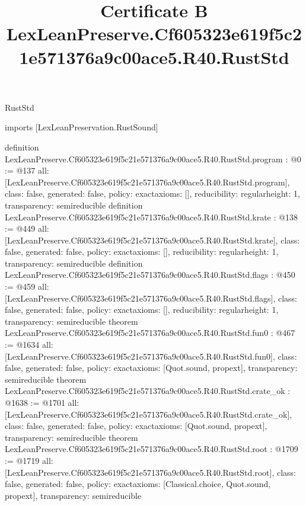 \begin{lexlean}{RustStd}
\title{Certificate B LexLeanPreserve.Cf605323e619f5c21e571376a9c00ace5.R40.RustStd}
\begin{coremodule}
imports [LexLeanPreservation.RustSound]

definition LexLeanPreserve.Cf605323e619f5c21e571376a9c00ace5.R40.RustStd.program : @0 := @137 {
  all: [LexLeanPreserve.Cf605323e619f5c21e571376a9c00ace5.R40.RustStd.program],
  class: false,
  generated: false,
  policy: exact{axioms: []},
  reducibility: regular{height: 1},
  transparency: semireducible
}
definition LexLeanPreserve.Cf605323e619f5c21e571376a9c00ace5.R40.RustStd.krate : @138 := @449 {
  all: [LexLeanPreserve.Cf605323e619f5c21e571376a9c00ace5.R40.RustStd.krate],
  class: false,
  generated: false,
  policy: exact{axioms: []},
  reducibility: regular{height: 1},
  transparency: semireducible
}
definition LexLeanPreserve.Cf605323e619f5c21e571376a9c00ace5.R40.RustStd.flags : @450 := @459 {
  all: [LexLeanPreserve.Cf605323e619f5c21e571376a9c00ace5.R40.RustStd.flags],
  class: false,
  generated: false,
  policy: exact{axioms: []},
  reducibility: regular{height: 1},
  transparency: semireducible
}
theorem LexLeanPreserve.Cf605323e619f5c21e571376a9c00ace5.R40.RustStd.fun0 : @467 := @1634 {
  all: [LexLeanPreserve.Cf605323e619f5c21e571376a9c00ace5.R40.RustStd.fun0],
  class: false,
  generated: false,
  policy: exact{axioms: [Quot.sound, propext]},
  transparency: semireducible
}
theorem LexLeanPreserve.Cf605323e619f5c21e571376a9c00ace5.R40.RustStd.crate_ok : @1638 := @1701 {
  all: [LexLeanPreserve.Cf605323e619f5c21e571376a9c00ace5.R40.RustStd.crate_ok],
  class: false,
  generated: false,
  policy: exact{axioms: [Quot.sound, propext]},
  transparency: semireducible
}
theorem LexLeanPreserve.Cf605323e619f5c21e571376a9c00ace5.R40.RustStd.root : @1709 := @1719 {
  all: [LexLeanPreserve.Cf605323e619f5c21e571376a9c00ace5.R40.RustStd.root],
  class: false,
  generated: false,
  policy: exact{axioms: [Classical.choice, Quot.sound, propext]},
  transparency: semireducible
}


\end{coremodule}
\end{lexlean}

